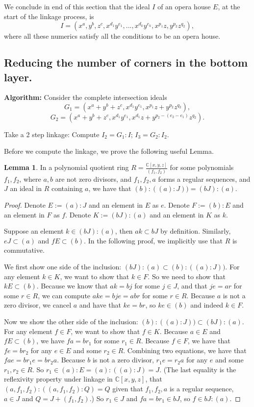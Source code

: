 \documentclass{amsart}[10pt]
\theoremstyle{plain}
\theoremstyle{definition}
\newtheorem{lemma}[theorem]{Lemma}
\begin{document}
We conclude in end of this section that the ideal $I$ of an opera house $E$, at the start of the linkage process, is $$I=(x^a, y^b, z^c, x^{d_1}y^{e_1}, ..., x^{d_k}y^{e_k}, x^{p_1}z, y^{p_2}z^{q_2}),$$ where all these numerics satisfy all the conditions to be an opera house.


\subsection{Reducing the number of corners in the bottom layer.\\}

\textbf{Algorithm:}
Consider the complete intersection ideals $$G_1=(x^a+y^b+z^c, x^{d_1}y^{e_1},x^{p_1}z+y^{p_2}z^{q_2}),$$ 
$$G_2=(x^a+y^b+z^c, x^{d_1}y^{e_1},x^{d_1}z+y^{p_2-(e_2-e_1)}z^{q_2}).$$

Take a 2 step linkage:
Compute $I_2=G_1:I$;  $I_3=G_2:I_2$.

Before we compute the linkage, we prove the following useful Lemma.

\begin{lemma}
\label{lem_single_gen}
In a polynomial quotient ring $R=\frac{\mathbb{C}[x,y,z]}{(f_1,f_2)}$ for some polynomials $f_1, f_2$, where $a,b$ are not zero divisors, and $f_1, f_2, a$ forms a regular sequences, and $J$ an ideal in $R$ containing $a$, we have that $(b):((a):J))=(bJ):(a)$.
\end{lemma}

\begin{proof}
Denote $E:=(a):J$ and an element in $E$ as $e$. Denote $F:=(b):E$ and an element in $F$ as $f$. Denote $K:=(bJ):(a)$ and an element in $K$ as $k$. 

Suppose an element $k \in (bJ):(a)$, then $ak \subset bJ$ by definition. Similarly, $eJ \subset (a)$ and $fE \subset (b)$. In the following proof, we implicitly use that $R$ is commutative.

We first show one side of the inclusion: $(bJ):(a) \subset (b):((a):J))$. For any element $k \in K$, we want to show that $k \in F$. So we need to show that $kE \subset (b)$. Because we know that $ak=bj$ for some $j \in J$, and that $je = ar$ for some $r \in R$, we can compute $ake=bje= abr$ for some $r \in R$. Because $a$ is not a zero divisor, we cancel $a$ and have that $ke=br$, so $ke \in (b)$ and indeed $k \in F$.

Now we show the other side of the inclusion:  $(b):((a):J)) \subset (bJ):(a)$. For any element $f \in F$, we want to show that $f \in K$. Because $a \in E$ and $fE \subset (b)$, we have $fa=br_1$ for some $r_1 \in R$. Because $f \in F$, we have that $fe=br_2$ for any $e \in E$ and some $r_2 \in R$. Combining two equations, we have that $fae=br_1e=br_2a$. Because $b$ is not a zero divisor, $r_1e=r_2a$ for any $e$ and some $r_1, r_2 \in R$. So $r_1\in (a):E = (a):((a):J)=J$. (The last equality is the reflexivity property under linkage in $\mathbb{C}[x,y,z]$, that $(a,f_1,f_2):((a,f_1,f_2) : Q)=Q$ given that $f_1, f_2,a$ is a regular sequence, $a \in J$ and $Q=J+(f_1,f_2)$.) So $r_1 \in J$ and $fa = br_1 \in bJ$, so $f \in bJ :(a)$.
\end{proof}
\end{document}
